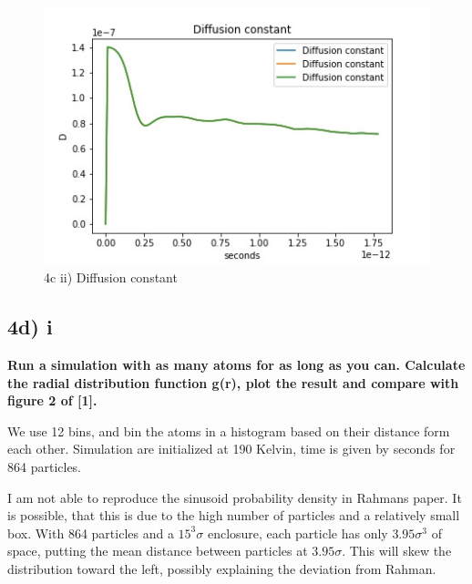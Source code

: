 \documentclass[a4paper,10pt,english]{article}
\begin{document}
\begin{figure}[h!]
        \centering 
        \includegraphics[scale=0.6]{./py/4c_ii_diffusionConstant.jpg} 
        \caption{4c ii) Diffusion constant }
        \label{fig:4cii_diffusionconstant}
\end{figure}

\subsection{4d) i}
\textbf{Run a simulation with as many atoms for as long as you can. Calculate the radial distribution
function g(r), plot the result and compare with figure 2 of [1].}

We use 12 bins, and bin the atoms in a histogram based on their distance form each other. Simulation are initialized at 190 Kelvin, time is given by  $ $seconds for 864 particles. 

I am not able to reproduce the sinusoid probability density in Rahmans paper. It is possible, that this is due to the high number of particles and a relatively small box. With 864 particles and a $15^3 \sigma$ enclosure, each particle has only $3.95 \sigma^3$ of space, putting the mean distance between particles at $3.95 \sigma$. This will skew the distribution toward the left, possibly explaining the deviation from Rahman.
\end{document}
